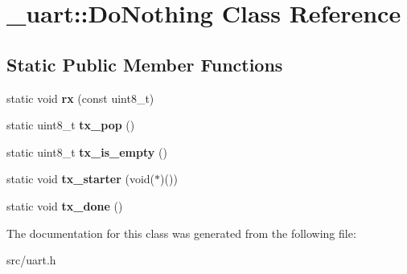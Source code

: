 \hypertarget{class__uart_1_1DoNothing}{}\section{\+\_\+uart\+:\+:Do\+Nothing Class Reference}
\label{class__uart_1_1DoNothing}
\subsection*{Static Public Member Functions}
\begin{DoxyCompactItemize}
\item 
\hypertarget{class__uart_1_1DoNothing_af1d748d45b8ed55e447ed645133e3da8}{}\label{class__uart_1_1DoNothing_af1d748d45b8ed55e447ed645133e3da8} 
static void {\bfseries rx} (const uint8\+\_\+t)
\item 
\hypertarget{class__uart_1_1DoNothing_a35623aa16751e5dbe382d95c0b3226d5}{}\label{class__uart_1_1DoNothing_a35623aa16751e5dbe382d95c0b3226d5} 
static uint8\+\_\+t {\bfseries tx\+\_\+pop} ()
\item 
\hypertarget{class__uart_1_1DoNothing_af4958b5945ef09cc249afade14d41c0b}{}\label{class__uart_1_1DoNothing_af4958b5945ef09cc249afade14d41c0b} 
static uint8\+\_\+t {\bfseries tx\+\_\+is\+\_\+empty} ()
\item 
\hypertarget{class__uart_1_1DoNothing_aaf0a6df601af97b896bdc6e06f5f9cec}{}\label{class__uart_1_1DoNothing_aaf0a6df601af97b896bdc6e06f5f9cec} 
static void {\bfseries tx\+\_\+starter} (void($\ast$)())
\item 
\hypertarget{class__uart_1_1DoNothing_a747b237efe72975ed73f1d2d929cef17}{}\label{class__uart_1_1DoNothing_a747b237efe72975ed73f1d2d929cef17} 
static void {\bfseries tx\+\_\+done} ()
\end{DoxyCompactItemize}


The documentation for this class was generated from the following file\+:\begin{DoxyCompactItemize}
\item 
src/uart.\+h\end{DoxyCompactItemize}
